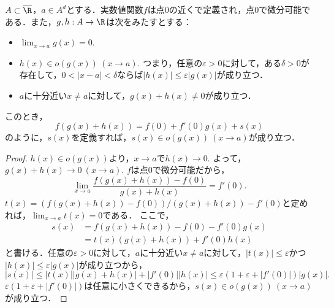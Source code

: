 \documentclass[a4paper,10pt]{ltjsarticle}
\begin{document}
\begin{MyLemma}
  \(A \subset \overline{\R}\)，\(a \in A^d\)とする．実数値関数\(f\)は点\(0\)の近くで定義され，点\(0\)で微分可能である．また，\(g, h: A \to \R\)は次をみたすとする：
  \begin{itemize}
    \item \(\lim_{x\to a}g(x) = 0\).
    \item \(h(x) \in o(g(x))\ (x \to a)\). つまり，任意の\(\varepsilon > 0\)に対して，ある\(\delta > 0\)が存在して，\(0 < |x - a| < \delta\)ならば\(|h(x)| \le \varepsilon |g(x)|\)が成り立つ．
    \item \(a\)に十分近い\(x \ne a\)に対して，\(g(x) + h(x) \ne 0\)が成り立つ．
  \end{itemize}
  このとき，
  \[ f(g(x) + h(x)) = f(0) + f'(0)g(x) + s(x) \]
  のように，\(s(x)\)を定義すれば，\(s(x) \in o(g(x))\ (x \to a)\)が成り立つ．
\end{MyLemma}
\begin{proof}
  \(h(x) \in o(g(x))\)より，\(x\to a\)で\(h(x) \to 0\). よって，\(g(x) + h(x) \to 0 \ (x \to a)\). \(f\)は点\(0\)で微分可能だから，
  \[ \lim_{x \to a} \frac{f(g(x) + h(x)) - f(0)}{g(x) + h(x)} = f'(0). \]
  \(t(x) = (f(g(x) + h(x)) - f(0))/(g(x) + h(x)) - f'(0)\)と定めれば，\(\lim_{x \to a} t(x) = 0\)である．
  ここで，
  \begin{align*}
    s(x) & = f(g(x) + h(x)) - f(0) - f'(0)g(x) \\
         & = t(x)(g(x) + h(x)) + f'(0)h(x)
  \end{align*}
  と書ける．任意の\(\varepsilon > 0\)に対して，\(a\)に十分近い\(x \ne a\)に対して，\(|t(x)| \le \varepsilon\)かつ\(|h(x)| \le \varepsilon |g(x)|\)が成り立つから，
  \[ |s(x)| \le |t(x)||g(x) + h(x)| + |f'(0)||h(x)| \le \varepsilon(1 + \varepsilon + |f'(0)|)|g(x)|. \]
  \(\varepsilon(1 + \varepsilon + |f'(0)|)\)は任意に小さくできるから，\(s(x) \in o(g(x))\ (x \to a)\)が成り立つ．
\end{proof}
\end{document}
